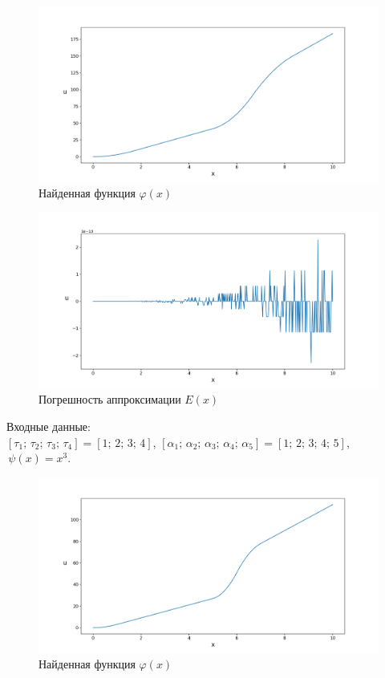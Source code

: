 \documentclass{article}
\theoremstyle{definition}
\begin{document}
\begin{figure}[H]
	\centering
	\includegraphics[trim={2.175cm, 0, 0, 1.5cm}, clip, scale=0.618]{7_u0.png}
	\caption{Найденная функция $\varphi(x)$}
	\label{fig:image21}
\end{figure}

\begin{figure}[H]
	\centering
	\includegraphics[trim={2.175cm, 0, 0, 1.5cm}, clip, scale=0.618]{7_E.png}
	\caption{Погрешность аппроксимации $E(x)$}
	\label{fig:image22}
\end{figure}

Входные данные: \\
$[\tau_1;\, \tau_2;\, \tau_3;\, \tau_4] = [1;\, 2;\, 3;\, 4]$, 
$[\alpha_1;\, \alpha_2;\, \alpha_3;\, \alpha_4;\, \alpha_5] = [1;\, 2;\, 3;\, 4;\, 5]$, 
$\,\psi(x) = x^3$.
\begin{figure}[H]
	\centering
	\includegraphics[trim={2.175cm, 0, 0, 1.5cm}, clip, scale=0.618]{8_u0.png}
	\caption{Найденная функция $\varphi(x)$}
	\label{fig:image23}
\end{figure}
\end{document}
